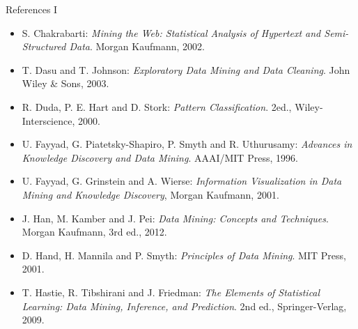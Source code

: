 \documentclass[aspectratio=169,t]{beamer}
\begin{document}
  { 
    \begin{frame}{References I}
        \begin{itemize}
          \item S. Chakrabarti: \emph{Mining the Web: Statistical Analysis of Hypertext and Semi-Structured Data}. Morgan Kaufmann, 2002.
          \item T. Dasu and T. Johnson: \emph{Exploratory Data Mining and Data Cleaning}. John Wiley \& Sons, 2003.
          \item R. Duda, P. E. Hart and D. Stork: \emph{Pattern Classification}. 2ed., Wiley-Interscience, 2000.
          \item U. Fayyad, G. Piatetsky-Shapiro, P. Smyth and R. Uthurusamy: \emph{Advances in Knowledge Discovery and Data Mining}. AAAI/MIT Press, 1996.
          \item U. Fayyad, G. Grinstein and A. Wierse: \emph{Information Visualization in Data Mining and Knowledge Discovery}, Morgan Kaufmann, 2001.
          \item J. Han, M. Kamber and J. Pei: \emph{Data Mining: Concepts and Techniques}. Morgan Kaufmann, 3rd ed., 2012.
          \item D. Hand, H. Mannila and P. Smyth: \emph{Principles of Data Mining}. MIT Press, 2001.
          \item T. Hastie, R. Tibshirani and J. Friedman: \emph{The Elements of Statistical Learning: Data Mining, Inference, and Prediction}. 2nd ed., Springer-Verlag, 2009.
        \end{itemize}
    \end{frame}
  }
\end{document}
